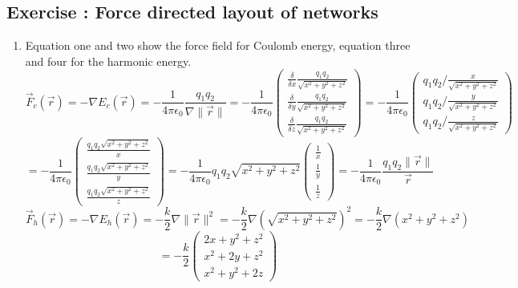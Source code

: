 \documentclass[10pt,a4paper]{article}
\newcommand{\exercise}[1]
{
  \stepcounter{subsection}
  \subsection*{Exercise \thesubsection: #1}

}
\begin{document}
\exercise{Force directed layout of networks}
\begin{enumerate}
\item Equation one and two show the force field for Coulomb energy, equation three and four for the harmonic energy.
\begin{equation}
\vec{F}_c(\vec{r}) = -\nabla E_c(\vec{r})
= -\frac{1}{4\pi\epsilon_0} \frac{q_1 q_2}{\nabla \|\vec{r}\|}
= -\frac{1}{4\pi\epsilon_0} \begin{pmatrix}
\frac{\delta}{\delta x} \frac{q_1 q_2}{\sqrt{x^2+y^2+z^2}} \\
\frac{\delta}{\delta y} \frac{q_1 q_2}{\sqrt{x^2+y^2+z^2}} \\
\frac{\delta}{\delta z} \frac{q_1 q_2}{\sqrt{x^2+y^2+z^2}} 
\end{pmatrix}
= -\frac{1}{4\pi\epsilon_0} \begin{pmatrix}
q_1 q_2 / \frac{x}{\sqrt{x^2+y^2+z^2}} \\
q_1 q_2 / \frac{y}{\sqrt{x^2+y^2+z^2}} \\
q_1 q_2 / \frac{z}{\sqrt{x^2+y^2+z^2}} 
\end{pmatrix}
\end{equation}
\begin{equation}
= -\frac{1}{4\pi\epsilon_0} \begin{pmatrix}
\frac{q_1 q_2 \sqrt{x^2+y^2+z^2}}{x} \\
\frac{q_1 q_2 \sqrt{x^2+y^2+z^2}}{y} \\
\frac{q_1 q_2 \sqrt{x^2+y^2+z^2}}{z} 
\end{pmatrix}
= -\frac{1}{4\pi\epsilon_0} q_1 q_2 \sqrt{x^2+y^2+z^2} \begin{pmatrix}
\frac{1}{x} \\
\frac{1}{y} \\
\frac{1}{z} 
\end{pmatrix}
= -\frac{1}{4\pi\epsilon_0} \frac{q_1 q_2 \|\vec{r}\|}{\vec{r}}
\end{equation}
\begin{equation}
\vec{F}_h(\vec{r}) = -\nabla E_h(\vec{r})
= -\frac{k}{2} \nabla \|\vec{r}\|^2
= -\frac{k}{2} \nabla (\sqrt{x^2+y^2+z^2})^2
= -\frac{k}{2} \nabla (x^2+y^2+z^2)
\end{equation}
\begin{equation}
= -\frac{k}{2} \begin{pmatrix}
2x+y^2+z^2 \\
x^2+2y+z^2 \\
x^2+y^2+2z
\end{pmatrix}
\end{equation}


\end{enumerate}
\end{document}
